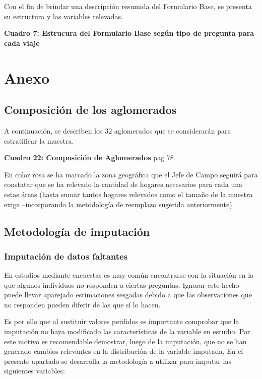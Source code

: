 \documentclass[
  openany]{book}
\begin{document}
Con el fin de brindar una descripción resumida del Formulario Base, se presenta su estructura y las variables relevadas.

\textbf{Cuadro 7: Estrucura del Formulario Base según tipo de pregunta para cada viaje}

\hypertarget{anexo}{%
\chapter{\texorpdfstring{\textbf{Anexo}}{Anexo}}\label{anexo}}

\hypertarget{composiciuxf3n-de-los-aglomerados}{%
\section{Composición de los aglomerados}\label{composiciuxf3n-de-los-aglomerados}}

A continuación, se describen los 32 aglomerados que se considerarán para estratificar la muestra.

\textbf{Cuadro 22: Composición de Aglomerados} pag 78

En color rosa se ha marcado la zona geográfica que el Jefe de Campo seguirá para constatar que se ha relevado la cantidad de hogares necesarios para cada una estas áreas (hasta sumar tantos hogares relevados como el tamaño de la muestra exige --incorporando la metodología de reemplazo sugerida anteriormente).

\hypertarget{metodologuxeda-de-imputaciuxf3n}{%
\section{Metodología de imputación}\label{metodologuxeda-de-imputaciuxf3n}}

\hypertarget{imputaciuxf3n-de-datos-faltantes}{%
\subsection{Imputación de datos faltantes}\label{imputaciuxf3n-de-datos-faltantes}}

En estudios mediante encuestas es muy común encontrarse con la situación en la que algunos individuos no responden a ciertas preguntas. Ignorar este hecho puede llevar aparejado estimaciones sesgadas debido a que las observaciones que no responden pueden diferir de las que sí lo hacen.

Es por ello que al sustituir valores perdidos es importante comprobar que la imputación no haya modificado las características de la variable en estudio. Por este motivo es recomendable demostrar, luego de la imputación, que no se han generado cambios relevantes en la distribución de la variable imputada. En el presente apartado se desarrolla la metodología a utilizar para imputar las siguientes variables:
\end{document}
